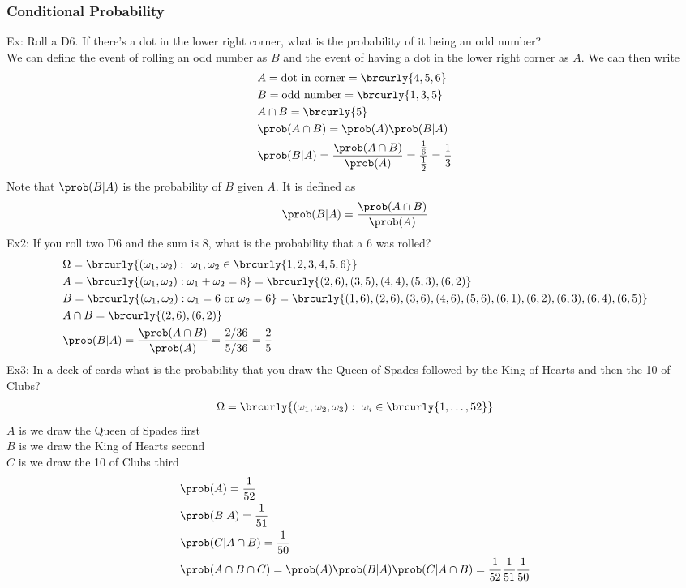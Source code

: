 \subsubsection{Conditional Probability}
Ex: Roll a D6. If there's a dot in the lower right corner, what is the probability of it being an odd number?\\
We can define the event of rolling an odd number as $B$ and the event of having a dot in the lower right corner as $A$. We can then write
\begin{align*}
    &A=\text{dot in corner}=\brcurly{4,5,6}\\
    &B=\text{odd number}=\brcurly{1,3,5}\\
    &A\cap B=\brcurly{5}\\
    &\prob(A\cap B)=\prob(A)\prob(B|A)\\
    &\prob(B|A)=\frac{\prob(A\cap B)}{\prob(A)}=\frac{\frac{1}{6}}{\frac{1}{2}}=\frac{1}{3}
\end{align*}
Note that $\prob(B|A)$ is the probability of $B$ given $A$. It is defined as
\[\prob(B|A)=\frac{\prob(A\cap B)}{\prob(A)}\]
Ex2: If you roll two D6 and the sum is 8, what is the probability that a 6 was rolled?
\begin{align*}
    &\Omega=\brcurly{(\omega_1,\omega_2):\ \omega_1,\omega_2\in\brcurly{1,2,3,4,5,6}}\\
    &A=\brcurly{(\omega_1,\omega_2):\omega_1+\omega_2=8}=\brcurly{(2,6),(3,5),(4,4),(5,3),(6,2)}\\
    &B=\brcurly{(\omega_1,\omega_2):\omega_1=6\text{ or }\omega_2=6}=\brcurly{(1,6),(2,6),(3,6),(4,6),(5,6),(6,1),(6,2),(6,3),(6,4),(6,5)}\\
    &A\cap B=\brcurly{(2,6),(6,2)}\\
    &\prob(B|A)=\frac{\prob(A\cap B)}{\prob(A)}=\frac{2/36}{5/36}=\frac{2}{5}
\end{align*}
Ex3: In a deck of cards what is the probability that you draw the Queen of Spades followed by the King of Hearts and then the 10 of Clubs?
\begin{align*}
    &\Omega=\brcurly{(\omega_1,\omega_2,\omega_3):\ \omega_i\in\brcurly{1,\ldots,52}}\\
\end{align*}
$A$ is we draw the Queen of Spades first\\
$B$ is we draw the King of Hearts second\\
$C$ is we draw the 10 of Clubs third
\begin{align*}
    &\prob(A)=\frac{1}{52}\\
    &\prob(B|A)=\frac{1}{51}\\
    &\prob(C|A\cap B)=\frac{1}{50}\\
    &\prob(A\cap B\cap C)=\prob(A)\prob(B|A)\prob(C|A\cap B)=\frac{1}{52}\frac{1}{51}\frac{1}{50}
\end{align*}
